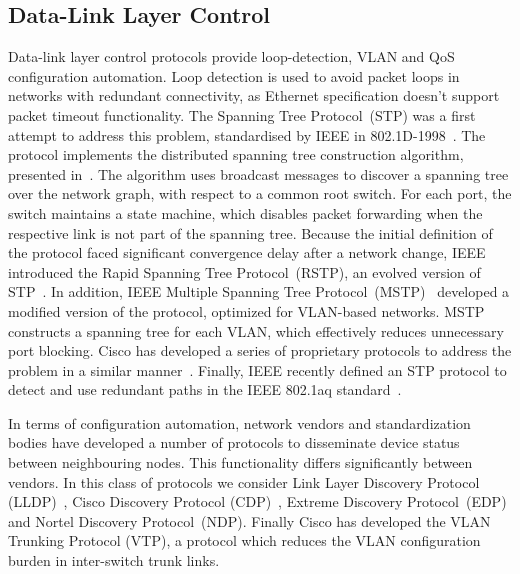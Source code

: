 \subsection{Data-Link Layer Control}

Data-link layer control protocols provide loop-detection, VLAN and QoS
configuration automation. Loop detection is used to avoid packet loops in
networks with redundant connectivity, as Ethernet specification doesn't
support packet timeout functionality.  The Spanning Tree Protocol~(STP) was a
first attempt to address this problem, standardised by IEEE in
802.1D-1998~. The protocol implements the distributed
spanning tree construction algorithm, presented in~. The
algorithm uses broadcast messages to discover a spanning tree over the network
graph, with respect to a common root switch. For each port, the switch maintains
a state machine, which disables packet forwarding when the respective link is
not part of the spanning tree.  Because the initial definition of the protocol
faced significant convergence delay after a network change, IEEE introduced the
Rapid Spanning Tree Protocol~(RSTP), an evolved version of
STP~.  In addition,  IEEE Multiple Spanning Tree
Protocol~(MSTP)~ developed a modified version of the protocol,
optimized for VLAN-based networks. MSTP constructs a spanning tree for each
VLAN, which effectively  reduces unnecessary port blocking. Cisco has developed a
series of proprietary protocols to address the problem in a similar
manner~.  Finally, IEEE recently defined an STP protocol to
detect and use redundant paths in the IEEE 802.1aq standard~.

In terms of configuration automation, network vendors and standardization bodies
have developed a number of protocols to disseminate device status between
neighbouring nodes. This functionality differs significantly between vendors.
In this class of protocols we consider Link Layer Discovery Protocol
(LLDP)~, Cisco Discovery Protocol
(CDP)~,  Extreme Discovery Protocol~(EDP) and Nortel Discovery
Protocol~(NDP). Finally Cisco has developed the VLAN Trunking Protocol (VTP), a
protocol which reduces the VLAN configuration burden in inter-switch trunk
links.

